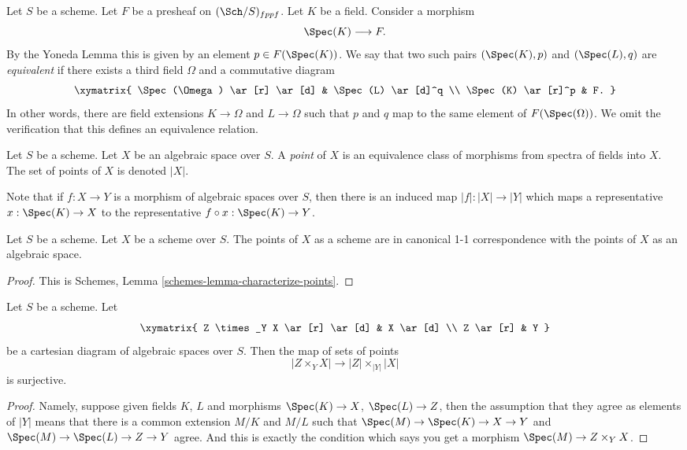 \medskip\noindent
Let $S$ be a scheme.
Let $F$ be a presheaf on $(\Sch/S)_{fppf}$.
Let $K$ be a field. Consider a morphism
$$
\Spec(K) \longrightarrow F.
$$
By the Yoneda Lemma this is given by an
element $p \in F(\Spec(K))$. We say that two such
pairs $(\Spec(K), p)$ and $(\Spec(L), q)$
are {\it equivalent} if there exists
a third field $\Omega$ and a commutative diagram
$$
\xymatrix{
\Spec(\Omega) \ar[r] \ar[d] &
\Spec(L) \ar[d]^q \\
\Spec(K) \ar[r]^p &
F.
}
$$
In other words, there are field extensions
$K \to \Omega$ and $L \to \Omega$ such that
$p$ and $q$ map to the same element
of $F(\Spec(\Omega))$. We omit the verification that this
defines an equivalence relation.

\begin{definition}
\label{definition-points}
Let $S$ be a scheme. Let $X$ be an algebraic space over $S$.
A {\it point} of $X$ is an equivalence class of morphisms
from spectra of fields into $X$.
The set of points of $X$ is denoted $|X|$.
\end{definition}

\noindent
Note that if $f : X \to Y$ is a morphism of algebraic spaces
over $S$, then there is an induced map $|f| : |X| \to |Y|$ which
maps a representative $x : \Spec(K) \to X$ to the representative
$f \circ x : \Spec(K) \to Y$.

\begin{lemma}
\label{lemma-scheme-points}
Let $S$ be a scheme. Let $X$ be a scheme over $S$.
The points of $X$ as a scheme are in canonical 1-1 correspondence
with the points of $X$ as an algebraic space.
\end{lemma}

\begin{proof}
This is Schemes, Lemma \ref{schemes-lemma-characterize-points}.
\end{proof}

\begin{lemma}
\label{lemma-points-cartesian}
Let $S$ be a scheme. Let
$$
\xymatrix{
Z \times_Y X \ar[r] \ar[d] & X \ar[d] \\
Z \ar[r] & Y
}
$$
be a cartesian diagram of algebraic spaces over $S$. Then the map of sets
of points
$$
|Z \times_Y X|
\longrightarrow
|Z| \times_{|Y|} |X|
$$
is surjective.
\end{lemma}

\begin{proof}
Namely, suppose given fields $K$, $L$ and morphisms
$\Spec(K) \to X$, $\Spec(L) \to Z$, then the
assumption that they agree as elements of $|Y|$ means that
there is a common extension $M/K$ and $M/L$
such that
$\Spec(M) \to \Spec(K) \to X \to Y$ and
$\Spec(M) \to \Spec(L) \to Z \to Y$ agree.
And this is exactly the condition which says you get a
morphism $\Spec(M) \to Z \times_Y X$.
\end{proof}

